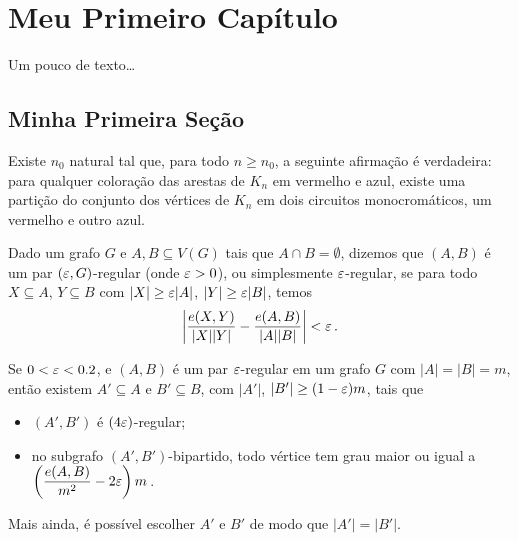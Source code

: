 \chapter{Meu Primeiro Capítulo}

Um pouco de texto\ldots

\section{Minha Primeira Seção}

\begin{teo}
  \label{teo_principal}
  Existe $n_0$ natural tal que, para todo $n\geq n_0$, a seguinte afirmação é verdadeira: para qualquer coloração das arestas de $K_n$ em vermelho e azul, existe uma partição do conjunto dos vértices de $K_n$ em dois circuitos monocromáticos, um vermelho e outro azul.
\end{teo}

\begin{defi}
	Dado um grafo $G$ e $A, B \subseteq V(G)$ tais que $A\cap B = \emptyset$, dizemos que $(A,B)$ é um par $(\varepsilon,G)$-regular (onde $\varepsilon>0$), ou simplesmente $\varepsilon$-regular, se para todo $X\subseteq A$, $Y\subseteq B$ com $\lvert X\rvert\geq\varepsilon\lvert A\rvert$, $\lvert Y\rvert\geq\varepsilon\lvert B\rvert$, temos
	\[
	\left\lvert \frac{e(X,Y)}{\lvert X\rvert\lvert Y\rvert} - \frac{e(A,B)}{\lvert A\rvert\lvert B\rvert}\right\rvert < \varepsilon\,.
	\]
\end{defi}

\begin{prop}
	\label{prop:remocao_de_grau_pequeno}
	Se $0<\varepsilon<0.2$, e $(A,B)$ é um par $\varepsilon$-regular em um grafo $G$ com $|A| = |B| = m$, então existem $A'\subseteq A$ e $B'\subseteq B$, com $\lvert A'\rvert$, $\lvert B'\rvert\geq(1-\varepsilon)m$, tais que
	\begin{itemize}
		\item $(A', B')$ é $(4\varepsilon)$-regular;
		\item no subgrafo $(A', B')$-bipartido, todo vértice tem grau maior ou igual a $\left(\dfrac{e(A,B)}{m^2} -2\varepsilon\right)m$\,.
	\end{itemize}
	Mais ainda, é possível escolher $A'$ e $B'$ de modo que $|A'| = |B'|$.
\end{prop}


